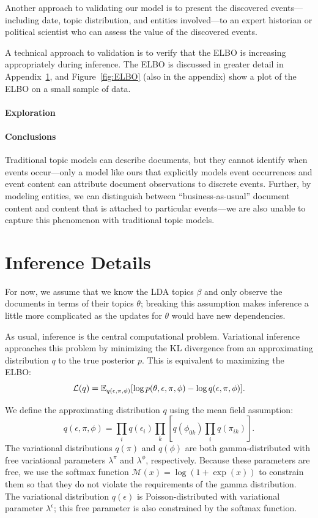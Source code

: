 Another approach to validating our model is to present the discovered events---including date, topic distribution, and entities involved---to an expert historian or political scientist who can assess the value of the discovered events.

A technical approach to validation is to verify that the ELBO is increasing appropriately during inference.  The ELBO is discussed in greater detail in Appendix~\ref{sec:appendix_inference}, and Figure~\ref{fig:ELBO} (also in the appendix) show a plot of the ELBO on a small sample of data.

\paragraph{Exploration}

\paragraph{Conclusions} Traditional topic models can describe documents, but they cannot identify when events occur---only a model like ours that explicitly models event occurrences and event content can attribute document observations to discrete events.  Further, by modeling entities, we can distinguish between ``business-as-usual'' document content and content that is attached to particular events---we are also unable to capture this phenomenon with traditional topic models.






\newpage
\appendix
\section{Inference Details}
\label{sec:appendix_inference}
For now, we assume that we know the LDA topics $\beta$ and only observe the documents in terms of their topics $\theta$; breaking this assumption makes inference a little more complicated as the updates for $\theta$ would have new dependencies.

As usual, inference is the central computational problem.  Variational inference approaches this problem by minimizing the KL divergence from an approximating distribution $q$ to the true posterior $p$.
This is equivalent to maximizing the ELBO: \[\mathcal{L}(q)  = \mathbb{E}_{q(\epsilon, \pi, \phi)}[\log p(\theta,\epsilon,\pi,\phi) - \log q(\epsilon, \pi, \phi)].\]

We define the approximating distribution $q$ using the mean field assumption: \[q(\epsilon, \pi, \phi) = \prod_i q(\epsilon_{i})\prod_k\left[q(\phi_{0k})\prod_i q(\pi_{ik})\right].\]
The variational distributions $q(\pi)$ and $q(\phi)$ are both gamma-distributed with free variational parameters $\lambda^\pi$ and $\lambda^\phi$, respectively.  Because these parameters are free, we use the softmax function $\mathcal{M}(x) = \log(1+\exp(x))$ to constrain them so that they do not violate the requirements of the gamma distribution.
The variational distribution $q(\epsilon)$ is Poisson-distributed with variational parameter $\lambda^\epsilon$; this free parameter is also constrained by the softmax function.

